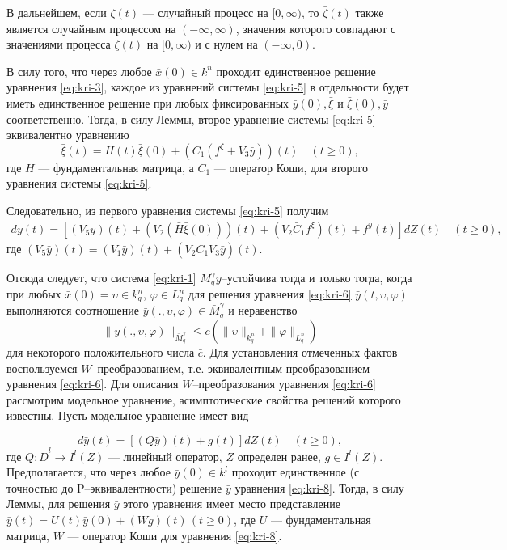 В дальнейшем, если $\zeta (t)$  --- случайный процесс на
$[0,\infty)$, то $\bar \zeta (t)$ также является  случайным
процессом на  $(- \infty , \infty )$, значения которого  совпадают с
значениями процесса $\zeta (t)$ на $[0,\infty)$ и с нулем на
$(-\infty , 0)$.

В силу того, что через любое $\bar x(0) \in k^n$ проходит
единственное решение уравнения \eqref{eq:kri-3}, каждое из уравнений системы \eqref{eq:kri-5}
в отдельности будет иметь единственное решение при любых
фиксированных $\bar y(0), \bar \xi $ и $\bar \xi(0), \bar y$
соответственно. Тогда, в силу Леммы, второе уравнение системы \eqref{eq:kri-5}
эквивалентно уравнению
$$
\bar \xi(t) = H(t)\bar \xi(0) + (C_1(f^\xi + V_3\bar y))(t) \quad
(t \ge 0),
$$
где $H$ --- фундаментальная матрица, а $C_1$ --- оператор Коши, для
второго уравнения системы \eqref{eq:kri-5}.

Следовательно, из первого уравнения системы \eqref{eq:kri-5} получим
\begin{equation}
    \label{eq:kri-6}
    \begin{array}{crl}
    d\bar y(t) = [(V_5\bar y)(t) + (V_2(\bar H\bar \xi(0)))(t)  +
    (V_2\bar C_1f^\xi)(t) + f^y(t)]dZ(t)\quad (t \ge 0),
    \end{array}
\end{equation}
где $(V_5\bar y)(t) = (V_1\bar y)(t)+ (V_2\bar C_1V_3\bar y)(t)$.


Отсюда следует, что система \eqref{eq:kri-1} $M_q^\gamma y$--устойчива тогда и
только тогда, когда при любых $\bar x(0) = \upsilon \in k^n_q$,
$\varphi \in L^n_q$ для решения уравнения \eqref{eq:kri-6} $\bar y(t, \upsilon,
\varphi)$ выполняются соотношение $\bar y(., \upsilon, \varphi) \in
\bar M_q^\gamma$ и неравенство
\begin{equation}
\label{eq:kri-7}
\|\bar y(., \upsilon, \varphi)\|_{\bar M_q^\gamma} \le \bar c\left(\|\upsilon\|_{k^n_q} +
 \|\varphi \|_{L^n_q}\right)   
\end{equation}
для некоторого положительного числа $\bar c$. Для установления
отмеченных фактов воспользуемся $W$--преобразованием, т.е.
эквивалентным преобразованием уравнения \eqref{eq:kri-6}. Для описания
$W$--преобразования уравнения \eqref{eq:kri-6} рассмотрим модельное уравнение,
асимптотические свойства решений которого известны. Пусть модельное
уравнение имеет вид

\begin{equation}
\label{eq:kri-8}
d\bar y(t) = [(Q\bar y)(t) + g(t)]dZ(t) \quad (t \ge 0), 
\end{equation}
где $Q:\bar D^l \rightarrow I^l(Z)$ --- линейный оператор, $Z$
определен ранее, $g \in I^l(Z)$. Предполагается, что через любое
$\bar y(0) \in k^l$ проходит единственное (с точностью до
P--эквивалентности) решение $\bar y$ уравнения \eqref{eq:kri-8}. Тогда, в силу
Леммы, для решения $\bar y$ этого уравнения имеет место
представление $\bar y(t) = U(t)\bar y(0) + (Wg)(t){\,} (t \ge 0)$,
где $U$ --- фундаментальная матрица, $W$ --- оператор Коши для
уравнения \eqref{eq:kri-8}.

